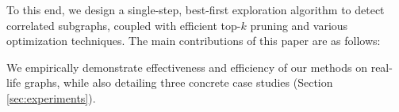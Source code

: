 
To this end, we design a single-step, best-first exploration algorithm to detect correlated subgraphs,
coupled with efficient top-$k$ pruning and various optimization techniques.
The main contributions of this paper are as follows:
\squishlist
\item
\item
\item
\item We empirically demonstrate effectiveness and efficiency of our methods on real-life graphs,
while also detailing three concrete case studies (Section \ref{sec:experiments}).
\squishend

